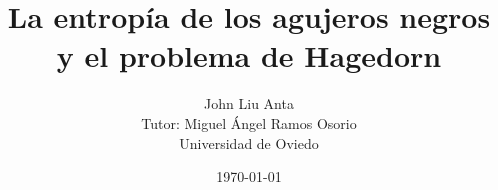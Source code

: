 \documentclass[secnumarabic,nobalancelastpage,10pt,nofootinbib,a4paper]{memoir}
\begin{document}

\title{ La entropía de los agujeros negros y el problema de Hagedorn }
\author         {John Liu Anta
                \\Tutor: Miguel Ángel Ramos Osorio
                \\ Universidad de Oviedo
              }
\date{\today}

\maketitle
\thispagestyle{empty}

\frontmatter

\tableofcontents*

\mainmatter

\renewcommand{\baselinestretch}{1.50}\normalsize















\end{document}
